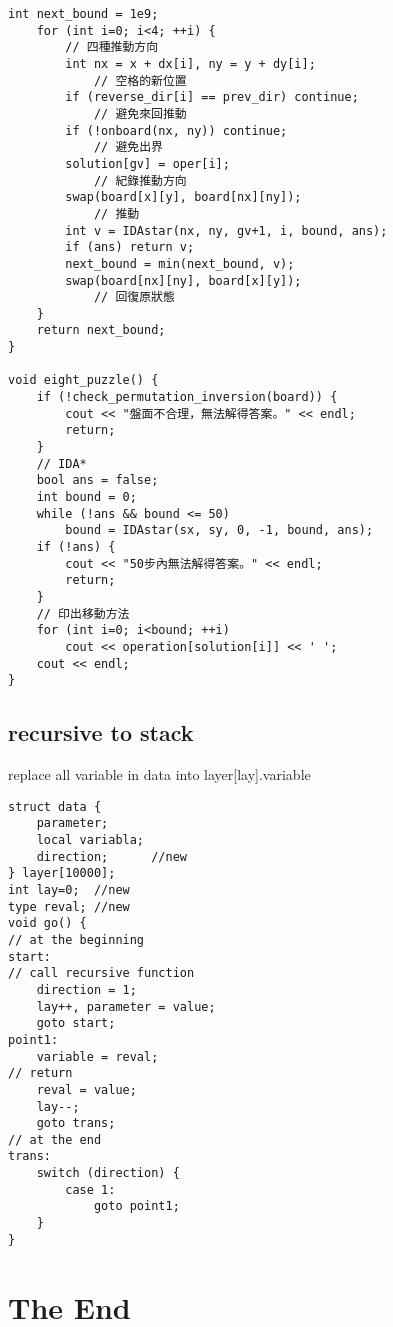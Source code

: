 \documentclass[11pt,twocolumn,a4paper]{article}
\begin{document}
\begin{lstlisting}[label=8 puzzle - IDA*]
	int next_bound = 1e9;
	for (int i=0; i<4; ++i) {
		// 四種推動方向
		int nx = x + dx[i], ny = y + dy[i];
			// 空格的新位置
		if (reverse_dir[i] == prev_dir) continue;
			// 避免來回推動
		if (!onboard(nx, ny)) continue;
			// 避免出界
		solution[gv] = oper[i];
			// 紀錄推動方向
		swap(board[x][y], board[nx][ny]);
			// 推動
		int v = IDAstar(nx, ny, gv+1, i, bound, ans);
		if (ans) return v;
		next_bound = min(next_bound, v);
		swap(board[nx][ny], board[x][y]);
			// 回復原狀態
	}
	return next_bound;
}
 
void eight_puzzle() {
	if (!check_permutation_inversion(board)) {
		cout << "盤面不合理，無法解得答案。" << endl;
		return;
	}
	// IDA*
	bool ans = false;
	int bound = 0;
	while (!ans && bound <= 50)
		bound = IDAstar(sx, sy, 0, -1, bound, ans);
	if (!ans) {
		cout << "50步內無法解得答案。" << endl;
		return;
	}
	// 印出移動方法
	for (int i=0; i<bound; ++i)
		cout << operation[solution[i]] << ' ';
	cout << endl;
}
\end{lstlisting}

\subsection{recursive to stack}
replace all variable in data into layer[lay].variable
\begin{lstlisting}[label=recursive to stack]
struct data {
	parameter;
	local variabla;
	direction;		//new
} layer[10000];
int lay=0;	//new
type reval;	//new
void go() {
// at the beginning
start:
// call recursive function	
	direction = 1;
	lay++, parameter = value;
	goto start;
point1:
	variable = reval;
// return
	reval = value;
	lay--;
	goto trans;
// at the end
trans:
	switch (direction) {
		case 1:
			goto point1;
	}
}
\end{lstlisting}

\section*{The End}
\end{document}
